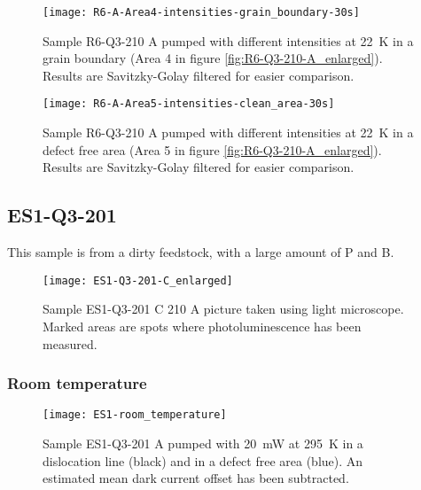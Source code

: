 \begin{figure}[H]
\centering
\texttt{[image: R6-A-Area4-intensities-grain\_boundary-30s]}
\caption[R6-Q3-210 at a grain boundary]{Sample R6-Q3-210 A pumped with different intensities at 22~K in a grain boundary (Area 4 in figure \ref{fig:R6-Q3-210-A_enlarged}). Results are Savitzky-Golay filtered for easier comparison.}
\label{fig:R6-A-Area4-intensities-grain_boundary-30s}%
\end{figure}


\begin{figure}[H]
\centering
\texttt{[image: R6-A-Area5-intensities-clean\_area-30s]}
\caption[R6-Q3-210 at a defect free area]{Sample R6-Q3-210 A pumped with different intensities at 22~K in a defect free area (Area 5 in figure \ref{fig:R6-Q3-210-A_enlarged}). Results are Savitzky-Golay filtered for easier comparison.}
\label{fig:R6-A-Area5-intensities-clean_area-30s}%
\end{figure}








\subsection{ES1-Q3-201}

This sample is from a dirty feedstock, with a large amount of P and B.


\begin{figure}[H]
\centering
\texttt{[image: ES1-Q3-201-C\_enlarged]}
\caption[ES1-Q3-201 C from light microscope]{Sample ES1-Q3-201 C 210 A picture taken using light microscope. Marked areas are spots where photoluminescence has been measured.}
\label{fig:ES1-Q3-201-C_enlarged}%
\end{figure}

\subsubsection{Room temperature}

\begin{figure}[H]
\centering
\texttt{[image: ES1-room\_temperature]}
\caption[ES1-Q3-201 at room temperature]{Sample ES1-Q3-201 A pumped with 20~mW at 295~K in a dislocation line (black) and in a defect free area (blue). An estimated mean dark current offset has been subtracted.}
\label{fig:ES1-room_temperature}%
\end{figure}


